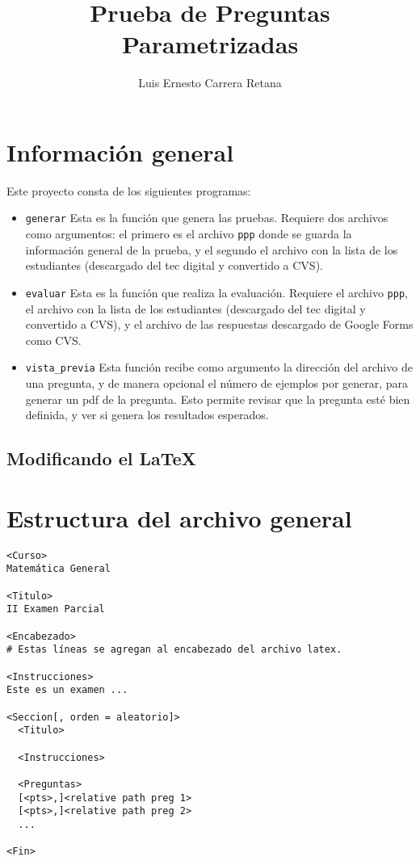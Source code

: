 \documentclass[12pt]{article}
\title{Prueba de Preguntas Parametrizadas}
\author{Luis Ernesto Carrera Retana}
\theoremstyle{definition}
\begin{document}
\maketitle

\section{Información general}

Este proyecto consta de los siguientes programas:
\begin{itemize}
  \item \verb|generar| Esta es la función que genera las pruebas. Requiere dos archivos como argumentos: el primero es el archivo \verb|ppp| donde se guarda la información general de la prueba, y el segundo el archivo con la lista de los estudiantes (descargado del tec digital y convertido a CVS).

  \item \verb|evaluar| Esta es la función que realiza la evaluación. Requiere el archivo \verb|ppp|, el archivo con la lista de los estudiantes (descargado del tec digital y convertido a CVS), y el archivo de las respuestas descargado de Google Forms como CVS.

  \item \verb|vista_previa| Esta función recibe como argumento la dirección del archivo de una pregunta, y de manera opcional el número de ejemplos por generar, para generar un pdf de la pregunta. Esto permite revisar que la pregunta esté bien definida, y ver si genera los resultados esperados.
\end{itemize}

\subsection{Modificando el \LaTeX}

\section{Estructura del archivo general}
\begin{verbatim}
<Curso>
Matemática General

<Titulo>
II Examen Parcial

<Encabezado>
# Estas líneas se agregan al encabezado del archivo latex.

<Instrucciones>
Este es un examen ...

<Seccion[, orden = aleatorio]>
  <Titulo>

  <Instrucciones>

  <Preguntas>
  [<pts>,]<relative path preg 1>
  [<pts>,]<relative path preg 2>
  ...

<Fin>
\end{verbatim}
\end{document}
